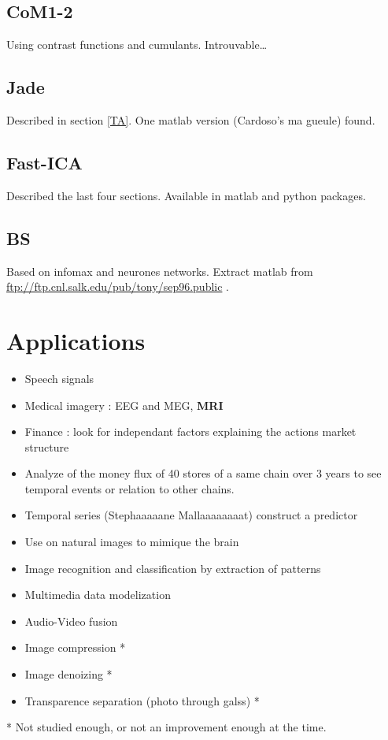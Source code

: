 \documentclass[a4paper,11pt,titlepage]{article}
\begin{document}
\subsection{CoM1-2}
Using contrast functions and cumulants. Introuvable\dots
\subsection{Jade}
Described in section \ref{TA}. One matlab version (Cardoso's ma gueule) found.
\subsection{Fast-ICA}
Described the last four sections. Available in matlab and python packages.
\subsection{BS}
Based on infomax and neurones networks. Extract matlab from \\\url{ftp://ftp.cnl.salk.edu/pub/tony/sep96.public} .
\section{Applications}
	\begin{itemize}
		\item Speech signals
		\item Medical imagery : EEG and MEG, \textbf{MRI}
		\item Finance : look for independant factors explaining the actions market structure
		\item Analyze of the money flux of 40 stores of a same chain over 3 years to see temporal events or relation to other chains.
		\item Temporal series (Stephaaaaane Mallaaaaaaaat) construct a predictor
		\item Use on natural images to mimique the brain 
		\item Image recognition and classification by extraction of patterns
		\item Multimedia data modelization
		\item Audio-Video fusion
		\item Image compression *
		\item Image denoizing *
		\item Transparence separation (photo through galss) *
	\end{itemize}
* Not studied enough, or not an improvement enough at the time.
\end{document}
